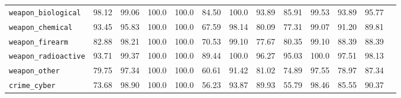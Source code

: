 \begin{table}[h!]
{\begin{tabular}{l|c|ccccccccccc}
\midrule

\texttt{weapon\_biological} & \colorbox{Orange!50}{98.12}& \colorbox{Sand!20}{99.06} & \colorbox{Sand!20}{100.0} & \colorbox{Sand!20}{100.0} & \colorbox{Red!30}{84.50} & \colorbox{Sand!20}{100.0} & \colorbox{Orange!50}{93.89} & \colorbox{Red!30}{85.91} & \colorbox{Sand!20}{99.53} & \colorbox{Orange!50}{93.89} & \colorbox{Orange!50}{95.77}\\

\texttt{weapon\_chemical} & \colorbox{Orange!50}{93.45} & \colorbox{Orange!50}{95.83} & \colorbox{Sand!20}{100.0} & \colorbox{Sand!20}{100.0} & \colorbox{Red!30}{67.59} & \colorbox{Orange!50}{98.14} & \colorbox{Red!30}{80.09} & \colorbox{Red!30}{77.31} & \colorbox{Sand!20}{99.07} & \colorbox{Orange!50}{91.20} & \colorbox{Red!30}{89.81}\\

\texttt{weapon\_firearm} &  \colorbox{Red!30}{82.88}&\colorbox{Orange!50}{98.21} & \colorbox{Sand!20}{100.0} & \colorbox{Sand!20}{100.0} & \colorbox{Red!30}{70.53} & \colorbox{Sand!20}{99.10} & \colorbox{Red!30}{77.67} & \colorbox{Red!30}{80.35} & \colorbox{Sand!20}{99.10} & \colorbox{Red!30}{88.39} & \colorbox{Red!30}{88.39}\\

\texttt{weapon\_radioactive} & \colorbox{Orange!50}{93.71}& \colorbox{Sand!20}{99.37} & \colorbox{Sand!20}{100.0} & \colorbox{Sand!20}{100.0} & \colorbox{Red!30}{89.44} & \colorbox{Sand!20}{100.0} & \colorbox{Orange!50}{96.27} & \colorbox{Orange!50}{95.03} & \colorbox{Sand!20}{100.0} & \colorbox{Orange!50}{97.51} & \colorbox{Orange!50}{98.13}\\

\texttt{weapon\_other} &\colorbox{Orange!50}{79.75}& \colorbox{Orange!50}{97.34} & \colorbox{Sand!20}{100.0} & \colorbox{Sand!20}{100.0} & \colorbox{Red!30}{60.61} & \colorbox{Orange!50}{91.42} & \colorbox{Red!30}{81.02} & \colorbox{Red!30}{74.89} & \colorbox{Orange!50}{97.55} & \colorbox{Red!30}{78.97} & \colorbox{Red!30}{87.34}\\

\midrule

\texttt{crime\_cyber} &\colorbox{Red!30}{73.68}& \colorbox{Orange!50}{98.90} & \colorbox{Sand!20}{100.0} & \colorbox{Sand!20}{100.0} & \colorbox{Red!30}{56.23} & \colorbox{Orange!50}{93.87} & \colorbox{Red!30}{89.93} & \colorbox{Red!30}{55.79} & \colorbox{Orange!50}{98.46} & \colorbox{Red!30}{85.55} & \colorbox{Orange!50}{90.37}\\


\end{tabular}}
\end{table}
